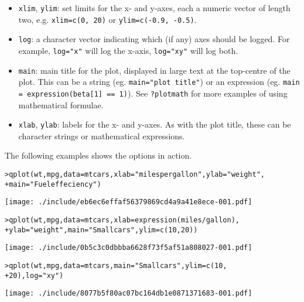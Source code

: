 \begin{itemize}
	\item {\tt xlim}, {\tt ylim}: set limits for the x- and y-axes, each a numeric vector of length two, e.g. {\tt xlim=c(0, 20)} or {\tt ylim=c(-0.9, -0.5)}.
	\item {\tt log}: a character vector indicating which (if any) axes should be logged.  For example, {\tt log="x"} will log the x-axis, {\tt log="xy"} will log both.
	\item {\tt main}: main title for the plot, displayed in large text at the top-centre of the plot.  This can be a string (eg. {\tt main="plot title"}) or an expression (eg. {\tt main = expression(beta[1] == 1)}).  See {\tt ?plotmath} for more examples of using mathematical formulae.
	\item {\tt xlab}, {\tt ylab}: labels for the x- and y-axes.  As with the plot title, these can be character strings or mathematical expressions.
\end{itemize}

The following examples shows the options in action.

\begin{alltt}
> qplot(wt, mpg, data = mtcars, xlab = "miles per gallon", ylab = "weight", 
+     main = "Fuel effeciency")
\end{alltt}
\texttt{[image: ./include/eb6ec6effaf56379869cd4a9a41e8ece-001.pdf]}
\begin{alltt}

> qplot(wt, mpg, data = mtcars, xlab = expression(miles/gallon), 
+     ylab = "weight", main = "Small cars", ylim = c(10, 20))
\end{alltt}
\texttt{[image: ./include/0b5c3c0dbbba6628f73f5af51a808027-001.pdf]}
\begin{alltt}

> qplot(wt, mpg, data = mtcars, main = "Small cars", ylim = c(10, 
+     20), log = "xy")
\end{alltt}
\texttt{[image: ./include/8077b5f80ac07bc164db1e0871371683-001.pdf]}
\begin{alltt}

\end{alltt}%

